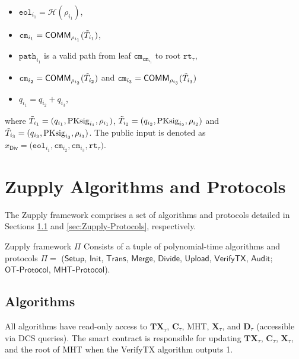 \begin{itemize}
    \item $\texttt{eol}_{i_1} = \mathcal{H}(\rho_{i_1} )$,
	\item $\texttt{cm}_{i_1} = \mathsf{COMM}_{\rho_{i_1}}(\Tilde{T}_{i_1})$,
	\item $\texttt{path}_{{i_1}}$ is a valid path from leaf  $\texttt{cm}_{\texttt{cm}_{i_1}}$ to root $\texttt{rt}_\tau$,


    \item $\texttt{cm}_{i_2} = \mathsf{COMM}_{\rho_{i_2}}(\Tilde{T}_{i_2})$ and $\texttt{cm}_{i_3} = \mathsf{COMM}_{\rho_{i_3}}(\Tilde{T}_{i_3})$
	\item $q_{i_1} = q_{i_2} + q_{i_3}$,
    
\end{itemize}
where  $\Tilde{T}_{i_1} = (q_{i_1}, \text{PKsig}_{i_1}, \rho_{i_1})$, $\Tilde{T}_{i_2} = (q_{i_2}, \text{PKsig}_{i_2}, \rho_{i_2})$ and $\Tilde{T}_{i_3} = (q_{i_3}, \text{PKsig}_{i_3}, \rho_{i_3})$. The public input is denoted as $x_\mathsf{Div} =\big(\texttt{eol}_{i_1}, \texttt{cm}_{i_{2}}, \texttt{cm}_{i_{3}}, \texttt{rt}_\tau \big)$.

\section{Zupply Algorithms and Protocols}
\label{sec:Zupply Algorithms}
The Zupply framework comprises a set of  algorithms and protocols detailed in Sections \ref{sec:Zupply-Algorithms} and \ref{sec:Zupply-Protocols}, respectively.

\begin{definition}
\label{def:Zupply Framework}
Zupply framework $\Pi$ Consists of a tuple of polynomial-time algorithms and protocols $\Pi = $ ($\textsf{Setup}$, $\textsf{Init}$,  $\textsf{Trans}$, $\textsf{Merge}$, $\textsf{Divide}$, $\textsf{Upload}$, $\textsf{VerifyTX}$, $\textsf{Audit}$; $\textsf{OT-Protocol}$, $\textsf{MHT-Protocol}$).
\end{definition}



\subsection{Algorithms} \label{sec:Zupply-Algorithms}%
All algorithms have read-only access to $\mathbf{TX}_\tau$, $\mathbf{C}_\tau$, \textsf{MHT}, $\mathbf{X}_\tau$, and $\mathbf{D}_\tau$ (accessible via \textsf{DCS} queries). The smart contract is responsible for updating $\mathbf{TX}_\tau$, $\mathbf{C}_\tau$, $\mathbf{X}_\tau$, and the root of \textsf{MHT} when the \textsf{VerifyTX} algorithm outputs 1.

